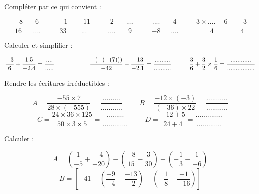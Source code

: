 \documentclass[a4paper,addpoints,12pt]{exam}
\begin{document}
\devoir[prv=false,ds=true,num=1 ,niv=2 , date=03/11/2022 ]

\begin{exo}[5]
\begin{questions}
\question Compléter par ce qui convient :
\end{questions}
\[\dfrac{-8}{16}=\dfrac{6}{....} \hspace{1cm}
\dfrac{-1}{33}=\dfrac{-11}{...}\hspace{1cm}
\dfrac{2}{....}=\dfrac{....}{9} \hspace{1cm}
\dfrac{....}{-8}=\dfrac{4}{....}\hspace{1cm}
\dfrac{3\times .... -6}{4}=\dfrac{-3}{4}\]

\end{exo}

\begin{exo}[4]
\begin{questions}
\question Calculer et simplifier :
\end{questions}
$\dfrac{-3}{6}+\dfrac{1.5}{-2.4}=\dfrac{....}{.....}\hspace{2cm}
\dfrac{-(-(-(7)))}{-42}-\dfrac{-13}{-2.1}=\dfrac{.........}{..........}\hspace*{1cm} \dfrac{3}{6}+\dfrac{3}{2}\times \dfrac{1}{6}=\dfrac{............}{................}$
\end{exo}


\begin{exo}[2]
\begin{questions}
\question Rendre les écritures irréductibles :
\end{questions}
\[A=\dfrac{-55\times7}{28\times(-555)} =\dfrac{.........}{...........}\hspace{1cm}
B=\dfrac{-12\times(-3)}{(-36)\times22}=\dfrac{...........}{...........}\]
\[C=\dfrac{24\times36\times125}{50\times3\times5}=\dfrac{.........}{.............} \hspace{1cm}
D=\dfrac{-12+5}{24+4}=\dfrac{..............}{.............}\]
\end{exo}

\begin{exo}[3]
\begin{questions}
\question Calculer :
\end{questions}
\begin{multicols}{2}
$$A=\left( \dfrac{1}{-5}+\dfrac{-4}{-20}\right) -\left(\dfrac{-8}{15}-\dfrac{3}{30}\right) -\left( -\dfrac{1}{3}-\dfrac{1}{-6} \right)$$
\columnbreak
$$B= \left[-41-\left( \dfrac{-9}{-4}-\dfrac{-13}{-2}\right) -\left( -\dfrac{1}{8}-\dfrac{-1}{-16} \right)\right]$$
\end{multicols}
\begin{multicols}{2}
\columnbreak
{}
\end{multicols}
\end{exo}
\end{document}
